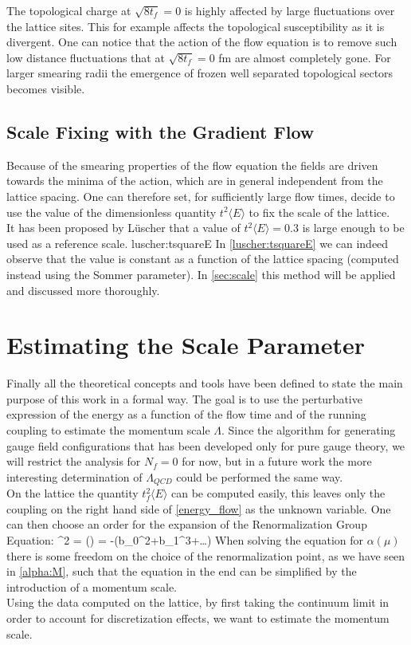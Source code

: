 The topological charge at $\sqrt{8t_f} = 0$ is highly affected by large fluctuations over the lattice sites. This for example affects the topological susceptibility as it is divergent. One can notice that the action of the flow equation is to remove such low distance fluctuations that at $\sqrt{8t_f} = 0$ fm are almost completely gone. For larger smearing radii the emergence of frozen well separated topological sectors becomes visible.

\subsection{Scale Fixing with the Gradient Flow}
\label{sec:scale_fixing}
Because of the smearing properties of the flow equation the fields are driven towards the minima of the action, which are in general independent from the lattice spacing. One can therefore set, for sufficiently large flow times, decide to use the value of the dimensionless quantity $t^2\langle E\rangle$ to fix the scale of the lattice. \\
It has been proposed by L{\"u}scher that a value of $t^2\langle E\rangle = 0.3$ is large enough to be used as a reference scale. 
 {luscher:tsquareE}
In \cref{luscher:tsquareE} we can indeed observe that the value is constant as a function of the lattice spacing (computed instead using the Sommer parameter). In \cref{sec:scale} this method will be applied and discussed more thoroughly.

\section{Estimating the Scale Parameter}
Finally all the theoretical concepts and tools have been defined to state the main purpose of this work in a formal way. The goal is to use the perturbative expression of the energy as a function of the flow time and of the running coupling to estimate the momentum scale  $\Lambda$. Since the algorithm for generating gauge field configurations that has been developed only for pure gauge theory, we will restrict the analysis for $N_f = 0$ for now, but in a future work the more interesting determination of $\Lambda_{QCD}$ could be performed the same way. \\
On the lattice the quantity $t_f^2\langle E \rangle$ can be computed easily, this leaves only the coupling on the right hand side of \cref{energy_flow} as the unknown variable. One can then choose an order for the expansion of the Renormalization Group Equation:
\beq
\mu^2  = \beta(\alpha) = -(b_0\alpha^2+b_1\alpha^3+\dots)
\eeq
When solving the equation for $\alpha(\mu)$ there is some freedom on the choice of the renormalization point, as we have seen in \cref{alpha:M}, such that the equation in the end can be simplified by the introduction of a momentum scale.\\
Using the data computed on the lattice, by first taking the continuum limit in order to account for discretization effects, we want to estimate the momentum scale. 


